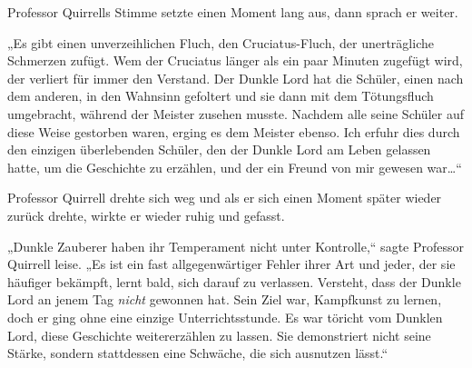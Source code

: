 Professor Quirrells Stimme setzte einen Moment lang aus, dann sprach er weiter.

„Es gibt einen unverzeihlichen Fluch, den Cruciatus-Fluch, der unerträgliche Schmerzen zufügt. Wem der Cruciatus länger als ein paar Minuten zugefügt wird, der verliert für immer den Verstand. Der Dunkle Lord hat die Schüler, einen nach dem anderen, in den Wahnsinn gefoltert und sie dann mit dem Tötungsfluch umgebracht, während der Meister zusehen musste. Nachdem alle seine Schüler auf diese Weise gestorben waren, erging es dem Meister ebenso. Ich erfuhr dies durch den einzigen überlebenden Schüler, den der Dunkle Lord am Leben gelassen hatte, um die Geschichte zu erzählen, und der ein Freund von mir gewesen war…“

Professor Quirrell drehte sich weg und als er sich einen Moment später wieder zurück drehte, wirkte er wieder ruhig und gefasst.

„Dunkle Zauberer haben ihr Temperament nicht unter Kontrolle,“ sagte Professor Quirrell leise. „Es ist ein fast allgegenwärtiger Fehler ihrer Art und jeder, der sie häufiger bekämpft, lernt bald, sich darauf zu verlassen. Versteht, dass der Dunkle Lord an jenem Tag \emph{nicht} gewonnen hat. Sein Ziel war, Kampfkunst zu lernen, doch er ging ohne eine einzige Unterrichtsstunde. Es war töricht vom Dunklen Lord, diese Geschichte weitererzählen zu lassen. Sie demonstriert nicht seine Stärke, sondern stattdessen eine Schwäche, die sich ausnutzen lässt.“

